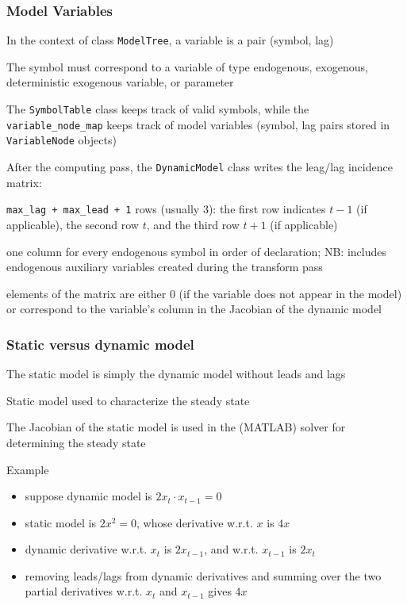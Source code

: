 \documentclass[aspectratio=169]{beamer}
\newenvironment{witemize}{\itemize\addtolength{\itemsep}{8pt}}{\enditemize}
\begin{document}
\begin{frame}
  \frametitle{Model Variables}
  \begin{witemize}
  \item In the context of class \texttt{ModelTree}, a \alert{variable} is a pair (symbol, lag)
  \item The symbol must correspond to a variable of type endogenous, exogenous, deterministic exogenous variable, or parameter
  \item The \texttt{SymbolTable} class keeps track of valid symbols, while the \texttt{variable\_node\_map} keeps track of model variables (symbol, lag pairs stored in \texttt{VariableNode} objects)
  \item After the computing pass, the \texttt{DynamicModel} class writes the leag/lag incidence matrix:
    \begin{witemize}
    \item \texttt{max\_lag + max\_lead + 1} rows (usually 3): the first row indicates $t-1$ (if applicable), the second row $t$, and the third row $t+1$ (if applicable)
    \item one column for every endogenous symbol in order of declaration; NB: includes endogenous auxiliary variables created during the transform pass
    \item elements of the matrix are either 0 (if the variable does not appear in the model) or correspond to the variable's column in the Jacobian of the dynamic model
    \end{witemize}
  \end{witemize}
\end{frame}

\begin{frame}
  \frametitle{Static versus dynamic model}
  \begin{witemize}
  \item The static model is simply the dynamic model without leads and lags
  \item Static model used to characterize the steady state
  \item The Jacobian of the static model is used in the (MATLAB) solver for determining the steady state
  \end{witemize}
  \begin{block}{Example}
    \begin{itemize}
    \item suppose dynamic model is $2x_t \cdot x_{t-1} = 0$
    \item static model is $2x^2 = 0$, whose derivative w.r.t. $x$ is $4x$
    \item dynamic derivative w.r.t. $x_t$ is $2x_{t-1}$, and w.r.t. $x_{t-1}$ is $2x_t$
    \item removing leads/lags from dynamic derivatives and summing over the two partial derivatives w.r.t. $x_t$ and $x_{t-1}$ gives $4x$
    \end{itemize}
  \end{block}
\end{frame}
\end{document}
